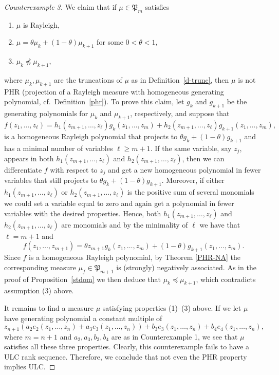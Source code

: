 \documentclass[10pt,reqno]{amsart}
\theoremstyle{plain}
\theoremstyle{definition}
\theoremstyle{remark}
\newcommand{\fP}{\mathfrak{P}}
\newcommand{\pc}{\preccurlyeq}
\begin{document}
\begin{proof}[Counterexample 3]
We claim that if $\mu\in\fP_m$ satisfies 
\begin{enumerate}
\item $\mu$ is Rayleigh, 
\item $\mu=\theta \mu_k +(1-\theta)\mu_{k+1}$ for some $0<\theta<1$, 
\item $\mu_k \not \pc \mu_{k+1}$, 
\end{enumerate}
where $\mu_k,\mu_{k+1}$ are the truncations of $\mu$ as in 
Definition~\ref{d-trunc}, then $\mu$ is not PHR (projection of a 
Rayleigh measure with homogeneous generating polynomial, 
cf.~Definition~\ref{phr}). 
To prove this claim, let $g_k$ and $g_{k+1}$ be the generating 
polynomials for $\mu_k$ and $\mu_{k+1}$, respectively, and suppose that 
$$
f(z_1,\ldots,z_\ell)=h_{1}(z_{m+1},\ldots, z_\ell)g_k(z_1,\ldots,z_m)
+h_2(z_{m+1},\ldots, z_\ell)g_{k+1}(z_1,\ldots,z_m),
$$
is a homogeneous Rayleigh polynomial that projects to 
$\theta g_k +(1-\theta)g_{k+1}$ and has a minimal number of 
variables $\ell\ge m+1$. If the same variable, say $z_j$, appears in both 
$h_{1}(z_{m+1},\ldots, z_\ell)$ and $h_2(z_{m+1},\ldots, z_\ell)$, 
then we can differentiate $f$ with respect to $z_j$ and get a new 
homogeneous polynomial in fewer variables that still projects to 
$\theta g_k +(1-\theta)g_{k+1}$. Moreover, if either 
$h_{1}(z_{m+1},\ldots, z_\ell)$ or  
$h_2(z_{m+1},\ldots, z_\ell)$ is the positive sum of several monomials we 
could set a variable equal to zero and again get a polynomial in fewer 
variables with the desired properties. Hence, both  
$h_{1}(z_{m+1},\ldots, z_\ell)$ and $h_2(z_{m+1},\ldots, z_\ell)$ are 
monomials and by the minimality of $\ell$ we have that $\ell=m+1$ and
$$
f(z_1,\ldots,z_{m+1})= \theta z_{m+1}g_k(z_1,\ldots,z_m)
+(1-\theta)g_{k+1}(z_1,\ldots,z_m). 
$$
Since $f$ is a homogeneous Rayleigh polynomial, by Theorem \ref{PHR-NA} 
the corresponding measure $\mu_f\in\fP_{m+1}$ is (strongly) negatively 
associated. As in the proof of Proposition~\ref{stdom} we then deduce that 
$\mu_k  \pc \mu_{k+1}$, which contradicts assumption (3) above. 

It remains to find a measure $\mu$ satisfying properties (1)--(3) above.
If we let $\mu$ have generating polynomial a constant multiple of 
$$
z_{n+1}(a_2e_2(z_1,\ldots, z_n) + a_3e_3(z_1,\ldots, z_n))+ 
b_3e_3(z_1,\ldots, z_n) + b_4e_4(z_1,\ldots, z_n),
$$
where $m=n+1$ and $a_2,a_3, b_3, b_4$ are as in Counterexample 1, we see that 
$\mu$ satisfies all these three properties. 
Clearly, this counterexample fails to have a ULC rank sequence. Therefore, 
we conclude that not even the PHR property implies ULC. 
\end{proof}
\end{document}
